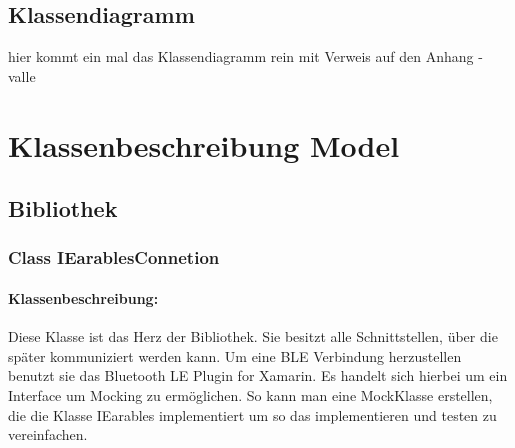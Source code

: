 \documentclass[a4paper,12pt]{article}
\begin{document}
  \subsection{Klassendiagramm}
hier kommt ein mal das Klassendiagramm rein mit Verweis auf den Anhang - valle
\clearpage
\section{Klassenbeschreibung Model}
\subsection{Bibliothek}
\subsubsection{Class IEarablesConnetion}

\paragraph{Klassenbeschreibung:}
Diese Klasse ist das Herz der Bibliothek. Sie besitzt alle Schnittstellen, über die später kommuniziert werden kann. Um eine BLE Verbindung herzustellen benutzt sie das Bluetooth LE Plugin for Xamarin. Es handelt sich hierbei um ein Interface um Mocking zu ermöglichen. So kann man eine MockKlasse erstellen, die die Klasse IEarables implementiert um so das implementieren und testen zu vereinfachen.
\end{document}

